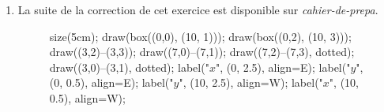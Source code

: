 \begin{enumerate}
	\item La suite de la correction de cet exercice est disponible sur \textit{cahier-de-prepa}.
		\begin{figure}[H]
			\centering
			\begin{asy}
				size(5cm);
				draw(box((0,0), (10, 1)));
				draw(box((0,2), (10, 3)));
				draw((3,2)--(3,3));
				draw((7,0)--(7,1));
				draw((7,2)--(7,3), dotted);
				draw((3,0)--(3,1), dotted);
				label("$x$", (0, 2.5), align=E);
				label("$y$", (0, 0.5), align=E);
				label("$y$", (10, 2.5), align=W);
				label("$x$", (10, 0.5), align=W);
			\end{asy}
		\end{figure}
\end{enumerate}
